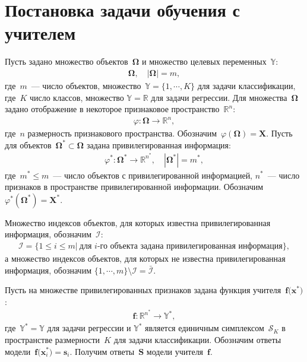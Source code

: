 \documentclass[12pt, twoside]{article}
\begin{document}
\section{Постановка задачи обучения с учителем}
Пусть задано множество объектов~$\bm{\Omega}$ и множество целевых переменных~$\mathbb{Y}$:
\[
\label{eq:st:1}
\begin{aligned}
\bm{\Omega}, \quad \left|\bm{\Omega}\right| = m,
\end{aligned}
\]
где~$m$~--- число объектов, множество~$\mathbb{Y}=\{1,\cdots,K\}$ для задачи классификации, где~$K$ число классов, множество $\mathbb{Y}=\mathbb{R}$ для задачи регрессии.
Для множества~$\bm{\Omega}$ задано отображение в некоторое признаковое пространство~$\mathbb{R}^{n}$:
\[
\label{eq:st:phi}
\begin{aligned}
\varphi:\bm{\Omega} \to \mathbb{R}^{n},
\end{aligned}
\]
где~$n$ размерность признакового пространства. Обозначим~$\varphi(\bm{\Omega}) = \mathbf{X}$.
Пусть для объектов~$\bm{\Omega}^* \subset \bm{\Omega}$ задана привилегированная информация:
\[
\label{eq:st:phi*}
\begin{aligned}
\varphi^*:\bm{\Omega}^* \to \mathbb{R}^{n^*}, \quad \left|\bm{\Omega}^*\right| = m^*,
\end{aligned}
\]
где~$m^* \leq m$~--- число объектов с привилегированной информацией, $n^*$~--- число признаков в пространстве привилегированной информации. Обозначим~$\varphi^*(\bm{\Omega}^*) = \mathbf{X}^*$.

Множество индексов объектов, для которых известна привилегированная информация, обозначим~$\mathcal{I}$:
\[
\label{eq:st:3}
\begin{aligned}
\mathcal{I} = \{1 \leq i \leq m |~\text{для $i$-го объекта задана привилегированная информация}\},
\end{aligned}
\]
а множество индексов объектов, для которых не известна привилегированная информация, обозначим $\{1, \cdots, m\}\setminus \mathcal{I} = \bar{\mathcal{I}}$.

Пусть на множестве привилегированных признаков задана функция учителя~$\mathbf{f}\bigr(\mathbf{x}^*\bigr)$:
\[
\label{eq:st:4}
\begin{aligned}
\mathbf{f}:\mathbb{R}^{n^*} \to \mathbb{Y}^*,
\end{aligned}
\]
где~$\mathbb{Y}^*=\mathbb{Y}$ для задачи регрессии и $\mathbb{Y}^*$ является единичным симплексом~$\mathcal{S}_K$ в пространстве размерности~$K$ для задачи классификации. Обозначим ответы модели~$\mathbf{f}\bigr(\mathbf{x}^*_i\bigr)=\mathbf{s}_i$.  Получим ответы~$\mathbf{S}$ модели учителя~$\mathbf{f}$.
\end{document}
